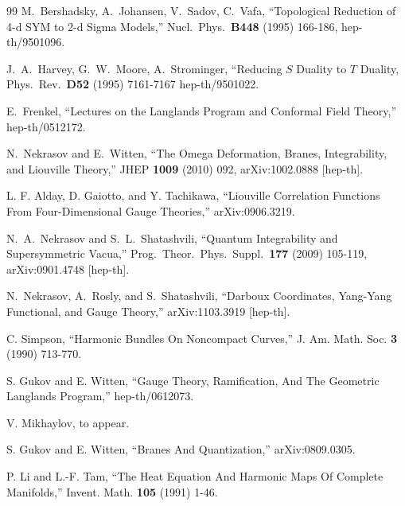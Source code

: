 \begin{thebibliography}{99}
 M.~Bershadsky, A.~Johansen, V.~Sadov, C.~Vafa,
  ``Topological Reduction of 4-d SYM to 2-d Sigma Models,''
  Nucl.\ Phys.\  {\bf B448 } (1995)  166-186,
  hep-th/9501096.

J.~A.~Harvey, G.~W.~Moore, A.~Strominger,
  ``Reducing $S$ Duality to $T$ Duality,
  Phys.\ Rev.\  {\bf D52 } (1995)  7161-7167
  hep-th/9501022.

 E.~Frenkel,
  ``Lectures on the Langlands Program and Conformal Field Theory,''
  hep-th/0512172.

N.~Nekrasov and E.~Witten,
  ``The Omega Deformation, Branes, Integrability, and Liouville Theory,''
  JHEP {\bf 1009 } (2010)  092,
  arXiv:1002.0888 [hep-th].

L. F. Alday, D. Gaiotto, and Y. Tachikawa, ``Liouville Correlation Functions From Four-Dimensional
Gauge Theories,'' arXiv:0906.3219.

 N.~A.~Nekrasov and S.~L.~Shatashvili,
  ``Quantum Integrability and Supersymmetric Vacua,''
  Prog.\ Theor.\ Phys.\ Suppl.\  {\bf 177 } (2009)  105-119,
  arXiv:0901.4748 [hep-th].


  N.~Nekrasov, A.~Rosly, and S.~Shatashvili,
  ``Darboux Coordinates, Yang-Yang Functional, and Gauge Theory,''
  arXiv:1103.3919 [hep-th].

C. Simpson, ``Harmonic Bundles On Noncompact Curves,'' J. Am. Math. Soc. {\bf 3} (1990)
713-770.

S. Gukov and E. Witten, ``Gauge Theory, Ramification, And The Geometric Langlands
Program,'' hep-th/0612073.


V. Mikhaylov, to appear.

S. Gukov and E. Witten, ``Branes And Quantization,''  arXiv:0809.0305.

P. Li and L.-F. Tam, ``The Heat Equation And Harmonic Maps Of Complete Manifolds,''
Invent. Math. {\bf 105} (1991) 1-46.

\end{thebibliography}
